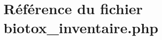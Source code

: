 \hypertarget{biotox__inventaire_8php}{
\section{R\'{e}f\'{e}rence du fichier biotox\_\-inventaire.php}
\label{biotox__inventaire_8php}
}
